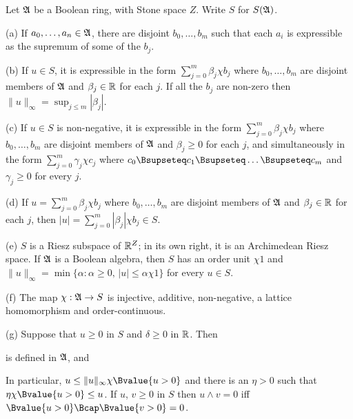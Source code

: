  Let $\frak A$ be a Boolean ring, with
Stone space $Z$.   Write $S$ for $S(\frak A)$.

(a) If $a_0,\ldots,a_n\in\frak A$,  there are disjoint $b_0,\ldots,b_m$
such that each $a_i$ is expressible as the supremum of some of the
$b_j$.

(b) If $u\in S$, it is expressible in the
form $\sum_{j=0}^m\beta_j\chi b_j$ where $b_0,\ldots,b_m$ are disjoint
members of $\frak A$ and $\beta_j\in\Bbb R$ for each $j$.   If all the
$b_j$ are non-zero then $\|u\|_{\infty}=\sup_{j\le m}|\beta_j|$.

(c) If $u\in S$ is non-negative, it is expressible in the
form $\sum_{j=0}^m\beta_j\chi b_j$ where $b_0,\ldots,b_m$ are disjoint
members of $\frak A$ and $\beta_j\ge 0$ for each $j$, and simultaneously
in the form $\sum_{j=0}^m\gamma_j\chi c_j$ where
$c_0\Bsupseteq c_1\Bsupseteq\ldots\Bsupseteq c_m$ and $\gamma_j\ge 0$ for every $j$.

(d) If $u=\sum_{j=0}^m\beta_j\chi b_j$ where $b_0,\ldots,b_m$ are
disjoint members of $\frak A$ and $\beta_j\in\Bbb R$ for each $j$, then
$|u|=\sum_{j=0}^m|\beta_j|\chi b_j\in S$.

(e) $S$ is a Riesz subspace of $\Bbb R^Z$;  in its own right, it is an
Archimedean Riesz space.   If $\frak A$ is a Boolean algebra, then $S$
has an order unit $\chi 1$ and
$\|u\|_{\infty}=\min\{\alpha:\alpha\ge 0,\,|u|\le\alpha\chi 1\}$ for every $u\in S$.

(f) The map $\chi:\frak A\to S$ is injective, additive, non-negative, a
lattice homomorphism and order-continuous.

(g) Suppose that $u\ge 0$ in $S$ and $\delta\ge 0$ in $\Bbb R$.   Then


\noindent is defined in $\frak A$, and


\noindent In particular, $u\le\|u\|_{\infty}\chi\Bvalue{u>0}$ and there
is an $\eta>0$ such that $\eta\chi\Bvalue{u>0}\le u$.   If $u$, $v\ge 0$
in $S$ then $u\wedge v=0$ iff $\Bvalue{u>0}\Bcap\Bvalue{v>0}=0$.

